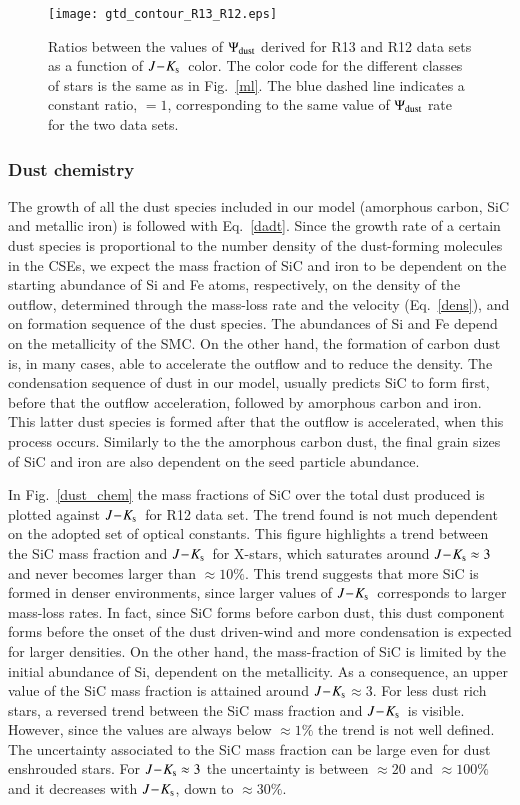 \documentclass[useAMS,usenatbib]{mn2e/mn2e}
\newcommand{\jks}{\mbox{$J\!-\!K_{\rm s}$}}
\begin{document}
{                        \begin{figure}
\texttt{[image: gtd\_contour\_R13\_R12.eps]}
        \caption{Ratios between the values of $\Psi_{\rm dust}$ derived for R13 and R12 data sets as a function of \jks\ color. The color code for the different classes of stars is the same as in Fig.~\ref{ml}. The blue dashed line indicates a constant ratio, $=1$, corresponding to the same value of $\Psi_{\rm dust}$ rate for the two data sets.}
        \label{gtd_R13_R12}
        \end{figure}
        
\subsubsection{Dust chemistry}
The growth of all the dust species included in our model (amorphous carbon, SiC and metallic iron) is followed with Eq.~\ref{dadt}.
Since the growth rate of a certain dust species is proportional to the number density of the dust-forming molecules in the CSEs, we expect the mass fraction of SiC and iron to be dependent on the starting abundance of Si and Fe atoms, respectively, on the density of the outflow, determined through the mass-loss rate and the velocity (Eq.~\ref{dens}), and on formation sequence of the dust species. The abundances of Si and Fe depend on the metallicity of the SMC. On the other hand, the formation of carbon dust is, in many cases, able to accelerate the outflow and to reduce the density. The condensation sequence of dust in our model, usually predicts SiC to form first, before that the outflow acceleration, followed by amorphous carbon and iron. This latter dust species is formed after that the outflow is accelerated, when this process occurs.
Similarly to the the amorphous carbon dust, the final grain sizes of SiC and iron are also dependent on the seed particle abundance.

In Fig.~\ref{dust_chem} the mass fractions of SiC over the total dust produced is plotted against \jks\ for R12 data set. The trend found is not much dependent on the adopted set of optical constants.
This figure highlights a trend between the SiC mass fraction and \jks\ for X-stars, which saturates around $\jks\approx3$ and never becomes larger than $\approx 10\%$. 
This trend suggests that more SiC is formed in denser environments, since larger values of \jks\ corresponds to larger mass-loss rates. In fact, since SiC forms before carbon dust, this dust component forms before the onset of the dust driven-wind and more condensation is expected for larger densities. On the other hand, the mass-fraction of SiC is limited by the initial abundance of Si, dependent on the metallicity. As a consequence, an upper value of the SiC mass fraction is attained around \jks$\approx3$.
For less dust rich stars, a reversed trend between the SiC mass fraction and \jks\ is visible. However, since the values are always below $\approx 1\%$ the trend is not well defined.
The uncertainty associated to the SiC mass fraction can be large even for dust enshrouded stars. For $\jks\approx3$ the uncertainty is between $\approx 20$ and $\approx 100\%$ and it decreases with $\jks$, down to $\approx 30\%$.

}
\end{document}
